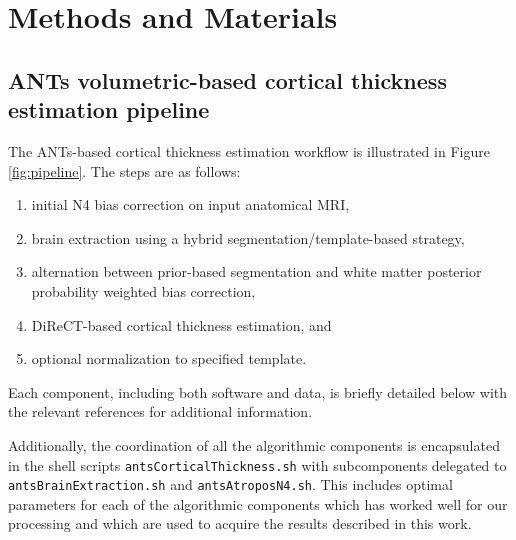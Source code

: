\section{Methods and Materials}

\subsection{ANTs volumetric-based cortical thickness estimation pipeline}

The ANTs-based cortical thickness estimation workflow is illustrated 
in Figure \ref{fig:pipeline}.  The steps are as follows:
\begin{enumerate}
  \item initial N4 bias correction on input anatomical MRI,
  \item brain extraction using a hybrid segmentation/template-based strategy,
  \item alternation between prior-based segmentation and white matter posterior
        probability weighted bias correction,
  \item DiReCT-based cortical thickness estimation, and
  \item optional normalization to specified template.
\end{enumerate}
Each component, including both software and data, is briefly detailed 
below with the relevant references for additional information. 


Additionally, the coordination of all the algorithmic components is
encapsulated in the shell scripts \verb#antsCorticalThickness.sh# with
subcomponents delegated to \verb#antsBrainExtraction.sh# 
and \verb#antsAtroposN4.sh#.  This includes
optimal parameters for each of the algorithmic components which has worked
well for our processing and which are used to acquire the results 
described in this work.

